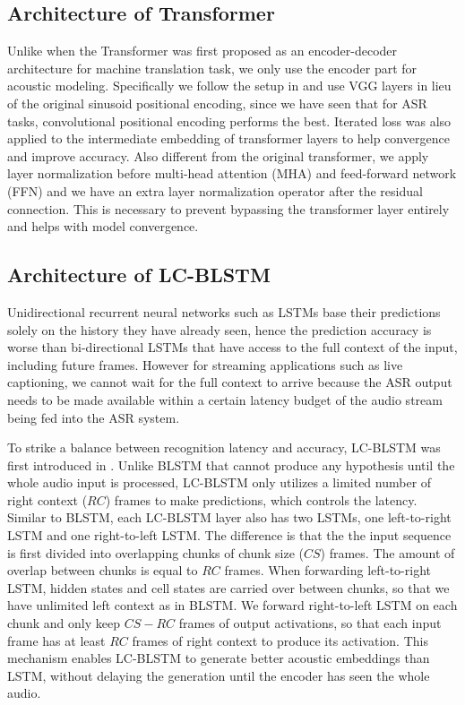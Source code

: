 \documentclass[a4paper]{article}
\begin{document}
\subsection{Architecture of Transformer}
\label{sec:transformer_arch}
Unlike when the Transformer\cite{vaswani2017attention} was first proposed as an encoder-decoder architecture for machine translation task, we only use the encoder part for acoustic modeling. Specifically we follow the setup in \cite{wang2019transformerbased} and use VGG layers\cite{abdel2014convolutional} in lieu of the original sinusoid positional encoding, since we have seen that for ASR tasks, convolutional positional encoding performs the best. Iterated loss\cite{Andros2019} was also applied to the intermediate embedding of transformer layers to help convergence and improve accuracy. Also different from the original transformer, we apply layer normalization \cite{lei2016layer} before multi-head attention (MHA) and feed-forward network (FFN) and we have an extra layer normalization operator after the residual connection. This is necessary to prevent bypassing the transformer layer entirely and helps with model convergence. 

\subsection{Architecture of LC-BLSTM}
\label{sec:lc_blstm_arch}

Unidirectional recurrent neural networks such as LSTMs base their predictions solely on the history they have already seen, hence the prediction accuracy is worse than bi-directional LSTMs that have access to the full context of the input, including future frames. However for streaming applications such as live captioning, we cannot wait for the full context to arrive because the ASR output needs to be made available within a certain latency budget of the audio stream being fed into the ASR system.

To strike a balance between recognition latency and accuracy, LC-BLSTM was first introduced in \cite{zhang2016highway}. Unlike BLSTM that cannot produce any hypothesis until the whole audio input is processed, LC-BLSTM only utilizes a limited number of right context ($RC$) frames to make predictions, which controls the latency. Similar to BLSTM, each LC-BLSTM layer also has two LSTMs, one left-to-right LSTM and one right-to-left LSTM. The difference is that the the input sequence is first divided into overlapping chunks of chunk size ($CS$) frames. The amount of overlap between chunks is equal to $RC$ frames. When forwarding left-to-right LSTM, hidden states and cell states are carried over between chunks, so that we have unlimited left context as in BLSTM. We forward right-to-left LSTM on each chunk and only keep $CS-RC$ frames of output activations, so that each input frame has at least $RC$ frames of right context to produce its activation. This mechanism enables LC-BLSTM to generate better acoustic embeddings than LSTM, without delaying the generation until the encoder has seen the whole audio.
\end{document}
